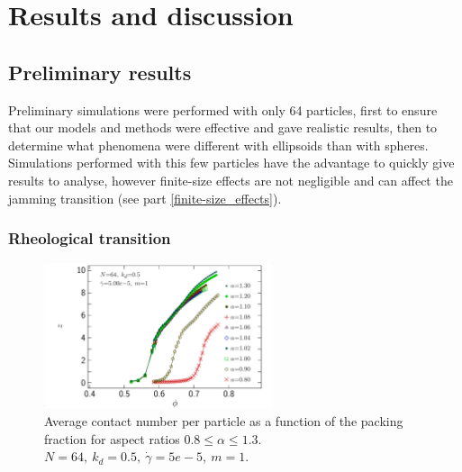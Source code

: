 \documentclass[class=report, float=false, crop=false]{standalone}
\begin{document}
\chapter{Results and discussion}
\label{chap:results}

\section{Preliminary results}

Preliminary simulations were performed with only 64 particles, first to ensure that our models and methods were effective and gave realistic results, then to determine what phenomena were different with ellipsoids than with spheres. Simulations performed with this few particles have the advantage to quickly give results to analyse, however finite-size effects are not negligible and can affect the jamming transition (see part \ref{finite-size_effects}).

\subsection{Rheological transition}

\begin{figure}[h!]
\centering
\includegraphics[width=0.6\textwidth]{figures/figs/z_phi_0064_KDk500_Ml100_GDg500}
\caption{Average contact number per particle as a function of the packing fraction for aspect ratios $0.8\le\alpha\le1.3$. $N=64,~ k_d=0.5,~ \dot{\gamma}=5e-5,~ m=1$.}
\label{z_phi_0064_KDk500_Ml100_GDg500}
\end{figure}
\end{document}
